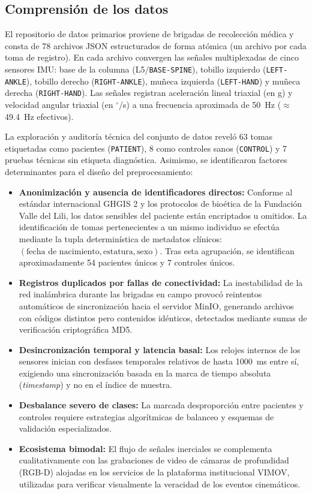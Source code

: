 \documentclass[12pt,a4paper]{article}
\begin{document}
\subsection{Comprensión de los datos}\label{sec:met-datos}

El repositorio de datos primarios proviene de brigadas de recolección médica y consta de 78 archivos JSON estructurados de forma atómica (un archivo por cada toma de registro). En cada archivo convergen las señales multiplexadas de cinco sensores IMU: base de la columna (L5/\texttt{BASE-SPINE}), tobillo izquierdo (\texttt{LEFT-ANKLE}), tobillo derecho (\texttt{RIGHT-ANKLE}), muñeca izquierda (\texttt{LEFT-HAND}) y muñeca derecha (\texttt{RIGHT-HAND}). Las señales registran aceleración lineal triaxial (en g) y velocidad angular triaxial (en $^\circ$/s) a una frecuencia aproximada de 50~Hz ($\approx$49.4~Hz efectivos).

La exploración y auditoría técnica del conjunto de datos reveló 63 tomas etiquetadas como pacientes (\texttt{PATIENT}), 8 como controles sanos (\texttt{CONTROL}) y 7 pruebas técnicas sin etiqueta diagnóstica. Asimismo, se identificaron factores determinantes para el diseño del preprocesamiento:
\begin{itemize}[itemsep=2pt]
  \item \textbf{Anonimización y ausencia de identificadores directos:} Conforme al estándar internacional GHGIS 2 y los protocolos de bioética de la Fundación Valle del Lili, los datos sensibles del paciente están encriptados u omitidos. La identificación de tomas pertenecientes a un mismo individuo se efectúa mediante la tupla determinística de metadatos clínicos: $(\text{fecha de nacimiento}, \text{estatura}, \text{sexo})$. Tras esta agrupación, se identifican aproximadamente 54 pacientes únicos y 7 controles únicos.
  \item \textbf{Registros duplicados por fallas de conectividad:} La inestabilidad de la red inalámbrica durante las brigadas en campo provocó reintentos automáticos de sincronización hacia el servidor MinIO, generando archivos con códigos distintos pero contenidos idénticos, detectados mediante sumas de verificación criptográfica MD5.
  \item \textbf{Desincronización temporal y latencia basal:} Los relojes internos de los sensores inician con desfases temporales relativos de hasta 1000~ms entre sí, exigiendo una sincronización basada en la marca de tiempo absoluta (\emph{timestamp}) y no en el índice de muestra.
  \item \textbf{Desbalance severo de clases:} La marcada desproporción entre pacientes y controles requiere estrategias algorítmicas de balanceo y esquemas de validación especializados.
  \item \textbf{Ecosistema bimodal:} El flujo de señales inerciales se complementa cualitativamente con las grabaciones de video de cámaras de profundidad (RGB-D) alojadas en los servicios de la plataforma institucional VIMOV, utilizadas para verificar visualmente la veracidad de los eventos cinemáticos.
\end{itemize}
\end{document}
